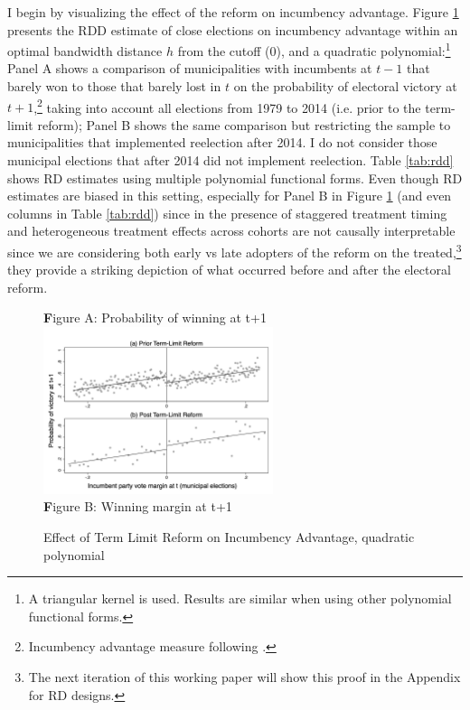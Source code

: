 \documentclass[12pt]{amsart}
\numberwithin{equation}{section}
\theoremstyle{definition}
\theoremstyle{definition}
\theoremstyle{definition}
\begin{document}
\begin{appendix}
I begin by visualizing the effect of the reform on incumbency advantage.  Figure \ref{fig:incumbency_advantage} presents the RDD estimate of close elections on incumbency advantage  within an optimal bandwidth distance $h$ from the cutoff (0), and a quadratic polynomial:\footnote{A triangular kernel is used. Results are similar when using other polynomial functional forms.} Panel A shows a comparison of municipalities with incumbents at $t-1$ that barely won to those that barely lost in $t$ on the probability of electoral victory at $t+1$,\footnote{Incumbency advantage measure following \citet{klasnja_titiunik_2017}.} taking into account all elections from 1979 to 2014 (i.e. prior to the term-limit reform); Panel B shows the same comparison but restricting the sample to municipalities that implemented reelection after 2014. I do not consider those municipal elections that after 2014 did not implement reelection. Table \ref{tab:rdd} shows RD estimates using multiple polynomial functional forms. Even though RD estimates are biased in this setting, especially for Panel B in Figure \ref{fig:incumbency_advantage} (and even columns in Table \ref{tab:rdd}) since in the presence of staggered treatment timing and heterogeneous treatment effects across cohorts are not causally interpretable since we are considering both early vs late adopters of the reform on the treated,\footnote{The next iteration of this working paper will show this proof in the Appendix for RD designs.} they provide a striking depiction of what occurred before and after the electoral reform. 


\begin{figure}[H]
\centering
\caption{Effect of Term Limit Reform on Incumbency Advantage, quadratic polynomial}
  \label{fig:incumbency_advantage} 

	{\textbf Figure A: Probability of winning at t+1}
	 \includegraphics[width=0.6\textwidth]{../Figures_incumbency/RDD_incumbency_pol2.png}
	 \\
	{\textbf Figure B: Winning margin at t+1}


\end{figure}
\end{appendix}
\end{document}
